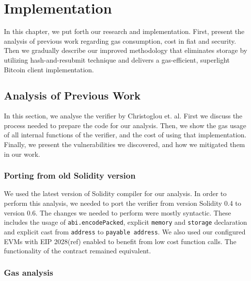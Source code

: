 \chapter{Implementation}

In this chapter, we put forth our research and implementation. First, present
the analysis of previous work regarding gas consumption, cost in fiat and
security. Then we gradually describe our improved methodology that eliminates
storage by utilizing hash-and-resubmit technique and delivers a gas-efficient,
superlight Bitcoin client implementation. 

\section{Analysis of Previous Work}

In this section, we analyse the verifier by Christoglou et. al. First we
discuss the process needed to prepare the code for our analysis. Then, we show
the gas usage of all internal functions of the verifier, and the cost of using
that implementation. Finally, we present the vulnerabilities we discovered, and
how we mitigated them in our work.

\subsection{Porting from old Solidity version}

We used the latest version of Solidity compiler for our analysis. In order to
perform this analysis, we needed to port the verifier from version Solidity 0.4
to version 0.6. The changes we needed to perform were mostly syntactic. These
includes the usage of \texttt{abi.encodePacked}, explicit \texttt{memory} and
\texttt{storage} declaration and explicit cast from \texttt{address} to
\texttt{payable address}. We also used our configured EVMs with EIP 2028(ref)
enabled to benefit from low cost function calls. The functionality of the
contract remained equivalent.


\subsection{Gas analysis}

